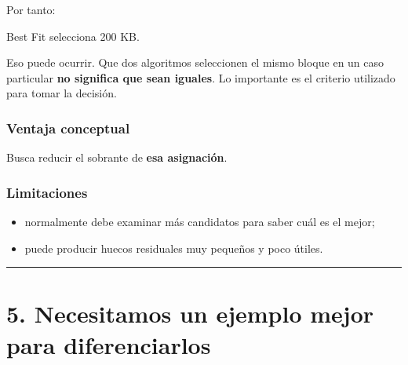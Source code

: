 \documentclass[
  spanish,
  letterpaper,
]{scrbook}
\newenvironment{Shaded}{\begin{snugshade}}{\end{snugshade}}
\newcommand{\NormalTok}[1]{\textcolor[rgb]{0.00,0.23,0.31}{#1}}
\providecommand{\tightlist}{%
  \setlength{\itemsep}{0pt}\setlength{\parskip}{0pt}}
\begin{document}
Por tanto:

\begin{Shaded}
\begin{Highlighting}[]
\NormalTok{Best Fit selecciona 200 KB.}
\end{Highlighting}
\end{Shaded}

\begin{tcolorbox}[enhanced jigsaw, arc=.35mm, bottomrule=.15mm, bottomtitle=1mm, breakable, colback=white, colbacktitle=quarto-callout-note-color!10!white, colframe=quarto-callout-note-color-frame, coltitle=black, left=2mm, leftrule=.75mm, opacityback=0, opacitybacktitle=0.6, rightrule=.15mm, title=\textcolor{quarto-callout-note-color}{\faInfo}\hspace{0.5em}{¡Aquí First Fit y Best Fit dieron el mismo resultado!}, titlerule=0mm, toprule=.15mm, toptitle=1mm]

Eso puede ocurrir. Que dos algoritmos seleccionen el mismo bloque en un
caso particular \textbf{no significa que sean iguales}. Lo importante es
el criterio utilizado para tomar la decisión.

\end{tcolorbox}

\subsection{Ventaja conceptual}\label{ventaja-conceptual-2}

Busca reducir el sobrante de \textbf{esa asignación}.

\subsection{Limitaciones}\label{limitaciones-6}

\begin{itemize}
\tightlist
\item
  normalmente debe examinar más candidatos para saber cuál es el mejor;
\item
  puede producir huecos residuales muy pequeños y poco útiles.
\end{itemize}

\begin{center}\rule{0.5\linewidth}{0.5pt}\end{center}


\chapter{5. Necesitamos un ejemplo mejor para
diferenciarlos}\label{necesitamos-un-ejemplo-mejor-para-diferenciarlos-1}
\end{document}
